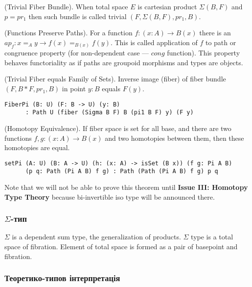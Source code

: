 \begin{definition} (Trivial Fiber Bundle).
When total space $E$ is cartesian product $\Sigma(B,F)$ and $p = pr_1$
then such bundle is called trivial $(F,\Sigma(B,F),pr_1,B)$.
\end{definition}

\begin{theorem} (Functions Preserve Paths).
For a function $f: (x:A) \rightarrow B(x)$
there is an $ap_f : x =_A y \rightarrow f(x) =_{B(x)} f(y)$. This is called
application of $f$ to path or congruence property (for non-dependent case ---
$cong$ function). This property behaves functoriality
as if paths are groupoid morphisms and types are objects.
\end{theorem}

\begin{theorem} (Trivial Fiber equals Family of Sets).
Inverse image (fiber) of fiber bundle $(F,B*F,pr_1,B)$ in point $y:B$ equals $F(y)$.
\begin{lstlisting}
FiberPi (B: U) (F: B -> U) (y: B)
      : Path U (fiber (Sigma B F) B (pi1 B F) y) (F y)
\end{lstlisting}
\end{theorem}

\begin{theorem} (Homotopy Equivalence).
If fiber space is set for all base, and
there are two functions $f,g : (x:A) \rightarrow B(x)$ and two
homotopies between them, then these homotopies are equal.
\begin{lstlisting}
setPi (A: U) (B: A -> U) (h: (x: A) -> isSet (B x)) (f g: Pi A B)
      (p q: Path (Pi A B) f g) : Path (Path (Pi A B) f g) p q
\end{lstlisting}
\end{theorem}

Note that we will not be able to prove this theorem
until \textbf{Issue III: Homotopy Type Theory} because
bi-invertible iso type will be announced there.

\subsubsection{$\Sigma$-тип}
$\Sigma$ is a dependent sum type, the generalization of products.
$\Sigma$ type is a total space of fibration. Element of total
space is formed as a pair of basepoint and fibration.

\subsubsection{Теоретико-типов інтерпретація}

